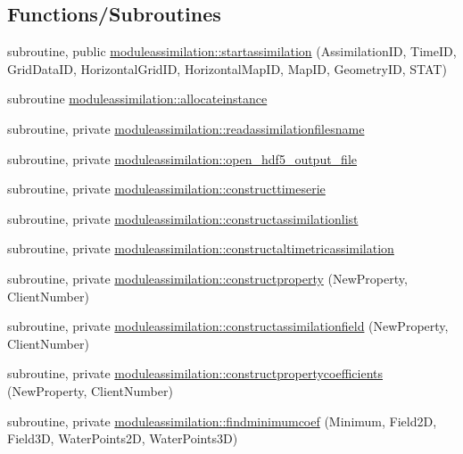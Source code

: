 \subsection*{Functions/\+Subroutines}
\begin{DoxyCompactItemize}
\item 
subroutine, public \mbox{\hyperlink{namespacemoduleassimilation_a686ae542667f0f0269fb4baa108cbcf7}{moduleassimilation\+::startassimilation}} (Assimilation\+ID, Time\+ID, Grid\+Data\+ID, Horizontal\+Grid\+ID, Horizontal\+Map\+ID, Map\+ID, Geometry\+ID, S\+T\+AT)
\item 
subroutine \mbox{\hyperlink{namespacemoduleassimilation_aad981de22073d1a61a32131d203265ca}{moduleassimilation\+::allocateinstance}}
\item 
subroutine, private \mbox{\hyperlink{namespacemoduleassimilation_a7409230e777bc5f92a43eb6fe78da6b9}{moduleassimilation\+::readassimilationfilesname}}
\item 
subroutine, private \mbox{\hyperlink{namespacemoduleassimilation_aaef927508148ef953ad8a480d4843ece}{moduleassimilation\+::open\+\_\+hdf5\+\_\+output\+\_\+file}}
\item 
subroutine, private \mbox{\hyperlink{namespacemoduleassimilation_ac14668590d74858a7daa3e19238d2a79}{moduleassimilation\+::constructtimeserie}}
\item 
subroutine, private \mbox{\hyperlink{namespacemoduleassimilation_a6f4678dd5995e947ccdc126f9abf9f6c}{moduleassimilation\+::constructassimilationlist}}
\item 
subroutine, private \mbox{\hyperlink{namespacemoduleassimilation_a26af0cc2dc6eb3e9e9dbefe2fb8c7b48}{moduleassimilation\+::constructaltimetricassimilation}}
\item 
subroutine, private \mbox{\hyperlink{namespacemoduleassimilation_af8bbe3b809fb38aac25e711c6dc7dc2e}{moduleassimilation\+::constructproperty}} (New\+Property, Client\+Number)
\item 
subroutine, private \mbox{\hyperlink{namespacemoduleassimilation_a458bfa1ab529ff7ecd2b6105aa5c04c3}{moduleassimilation\+::constructassimilationfield}} (New\+Property, Client\+Number)
\item 
subroutine, private \mbox{\hyperlink{namespacemoduleassimilation_a1af2e006a02d8457d8516853b6a03307}{moduleassimilation\+::constructpropertycoefficients}} (New\+Property, Client\+Number)
\item 
subroutine, private \mbox{\hyperlink{namespacemoduleassimilation_a9edf40407a0e79e84d746e6bf866bf17}{moduleassimilation\+::findminimumcoef}} (Minimum, Field2D, Field3D, Water\+Points2D, Water\+Points3D)

\end{DoxyCompactItemize}
